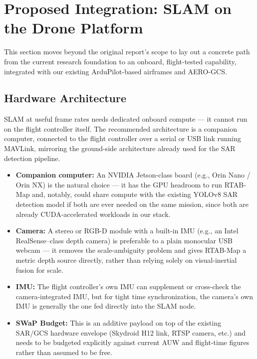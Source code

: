 \documentclass[11pt,a4paper]{article}
\begin{document}
\newpage

\section{Proposed Integration: SLAM on the Drone Platform}
\label{sec:integration}
This section moves beyond the original report's scope to lay out a concrete path from the current research foundation to an onboard, flight-tested capability, integrated with our existing ArduPilot-based airframes and AERO-GCS.

\subsection{Hardware Architecture}
SLAM at useful frame rates needs dedicated onboard compute --- it cannot run on the flight controller itself. The recommended architecture is a companion computer, connected to the flight controller over a serial or USB link running MAVLink, mirroring the ground-side architecture already used for the SAR detection pipeline.
\begin{itemize}
    \item \textbf{Companion computer:} An NVIDIA Jetson-class board (e.g., Orin Nano / Orin NX) is the natural choice --- it has the GPU headroom to run RTAB-Map and, notably, could share compute with the existing YOLOv8 SAR detection model if both are ever needed on the same mission, since both are already CUDA-accelerated workloads in our stack.
    \item \textbf{Camera:} A stereo or RGB-D module with a built-in IMU (e.g., an Intel RealSense--class depth camera) is preferable to a plain monocular USB webcam --- it removes the scale-ambiguity problem and gives RTAB-Map a metric depth source directly, rather than relying solely on visual-inertial fusion for scale.
    \item \textbf{IMU:} The flight controller's own IMU can supplement or cross-check the camera-integrated IMU, but for tight time synchronization, the camera's own IMU is generally the one fed directly into the SLAM node.
    \item \textbf{SWaP Budget:} This is an additive payload on top of the existing SAR/GCS hardware envelope (Skydroid H12 link, RTSP camera, etc.) and needs to be budgeted explicitly against current AUW and flight-time figures rather than assumed to be free.
\end{itemize}
\end{document}
